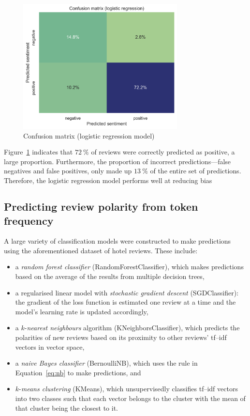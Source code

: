 \documentclass[12pt, a4paper]{pancake-article}
\begin{document}
\begin{figure}
	\begin{center}
		\includegraphics[width=0.75\textwidth]{../results/logistic_confuse.png}
	\end{center}
	\caption{Confusion matrix (logistic regression model)}\label{fig:logistic-confuse}
\end{figure}

Figure~\ref{fig:logistic-confuse} indicates that $\qty{72}{\percent}$ of reviews were correctly predicted as positive, a large proportion.
Furthermore, the proportion of incorrect predictions---false negatives and false positives, only made up
$\qty{13}{\percent}$ of the entire set of predictions. Therefore, the logistic regression model performs
well at reducing bias 

\subsection{Predicting review polarity from token frequency}

A large variety of classification models were constructed to make predictions using the aforementioned
dataset of hotel reviews. These include:

\begin{itemize}
  \item a \textit{random forest classifier} (RandomForestClassifier), which makes predictions based on the average of the results from multiple decision trees,
  \item a regularised linear model with \textit{stochastic gradient descent} (SGDClassifier): the gradient of the loss function is estimated one review at a time and the model's learning rate is updated accordingly,
  \item a $k$-\textit{nearest neighbours} algorithm (KNeighborsClassifier), which predicts the polarities of new reviews based on its proximity to other reviews' tf--idf vectors in vector space,
  \item a \textit{naive Bayes classifier} (BernoulliNB), which uses the rule in Equation~\ref{eq:nb} to make predictions, and
  \item $k$-\textit{means clustering} (KMeans), which unsupervisedly classifies tf--idf vectors into two classes such that each vector belongs to the cluster with the mean of that cluster being the closest to it.
\end{itemize}
\end{document}
